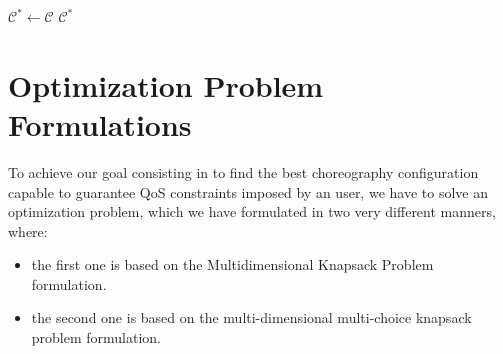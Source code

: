 \documentclass[12pt,a4paper]{report}
\begin{document}
\begin{algorithm}
	
	$\mathcal{C}^* \leftarrow \mathcal{C}$\;
	\Return $\mathcal{C}^*$
\end{algorithm}











\section{Optimization Problem Formulations}

To achieve our goal consisting in to find the best choreography configuration capable to guarantee QoS constraints imposed by an user, we have to solve an optimization problem, which we have formulated in two very different manners, where:

\begin{itemize}
	\item the first one is based on the Multidimensional Knapsack Problem formulation.
	\item the second one is based on the multi-dimensional multi-choice knapsack problem formulation. 
\end{itemize}
\end{document}
